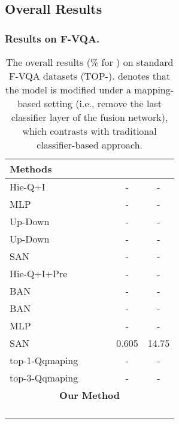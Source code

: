 \documentclass[runningheads]{llncs}
\begin{document}
\subsection{Overall Results }\label{sec:Overall Results}
\subsubsection{Results on F-VQA.}
\setlength{\tabcolsep}{7pt}
\begin{table}[htbp]
\scriptsize
\caption{The overall results (\% for ) on standard F-VQA datasets (TOP-).  denotes that the model is modified under a mapping-based setting (i.e., remove the last classifier layer of the  fusion network), which contrasts with traditional classifier-based approach.}
\label{tab:Overall Results of General}
\centering
\begin{tabular}{l|ccccc}
 \toprule
\multirow{1}{*}{{\bf \quad   Methods }}                        
& {\bf }
& 
& 
& 
& 
\\ 
 \midrule
\quad Hie-Q+I \cite{DBLP:conf/nips/LuYBP16}		&  &   &  & - & - \\
\quad MLP			&  &   &  & - & - \\ 	
\quad Up-Down \cite{DBLP:conf/cvpr/00010BT0GZ18} 	&  &   &  & - & - \\
\quad Up-Down &  &   &   & - & - \\  	
\quad SAN \cite{DBLP:conf/cvpr/YangHGDS16}		&  &   &  & - & - \\
\quad Hie-Q+I+Pre \cite{DBLP:conf/nips/LuYBP16}	&  &   &  & - & - \\	 
\quad BAN \cite{DBLP:conf/nips/KimJZ18}			&  &   &  & - & - \\ 	 
\quad BAN &  &   &   & - & - \\
\quad MLP &  &   &   & - & - \\
\quad SAN &  &   &  & 0.605 & 14.75 \\   	 	 	 
\quad top-1-Qqmaping \cite{DBLP:journals/pami/WangWSDH18}	&  &   &  & - & - \\
\quad top-3-Qqmaping \cite{DBLP:journals/pami/WangWSDH18}	&  &   &  & - & - \\	 	 
\midrule
\multicolumn{6}{c}{\bf Our Method }\\
\midrule
\quad  &   &    &   &  &  \\			 	
\quad  &   &    &   &  &  \\			 	
\quad  &   &    &   &  &  \\ 			 	
\quad  &   &    &   &  &  \\ 			 	
\bottomrule 
\end{tabular}
\end{table}
\end{document}
